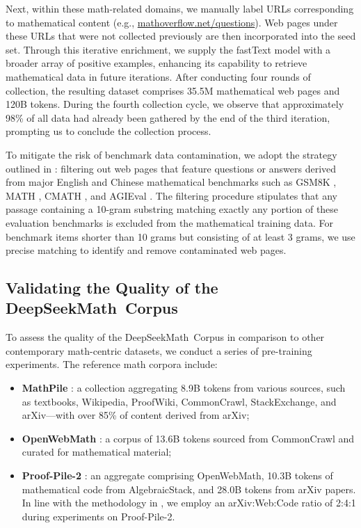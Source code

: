 Next, within these math-related domains, we manually label URLs corresponding to mathematical content (e.g., \url{mathoverflow.net/questions}). Web pages under these URLs that were not collected previously are then incorporated into the seed set. Through this iterative enrichment, we supply the fastText model with a broader array of positive examples, enhancing its capability to retrieve mathematical data in future iterations. After conducting four rounds of collection, the resulting dataset comprises 35.5M mathematical web pages and 120B tokens. During the fourth collection cycle, we observe that approximately 98\% of all data had already been gathered by the end of the third iteration, prompting us to conclude the collection process.

To mitigate the risk of benchmark data contamination, we adopt the strategy outlined in \cite{deepseek-coder}: filtering out web pages that feature questions or answers derived from major English and Chinese mathematical benchmarks such as GSM8K \citep{gsm8k}, MATH \citep{MATH}, CMATH \citep{wei2023cmath}, and AGIEval \citep{agieval}. The filtering procedure stipulates that any passage containing a 10-gram substring matching exactly any portion of these evaluation benchmarks is excluded from the mathematical training data. For benchmark items shorter than 10 grams but consisting of at least 3 grams, we use precise matching to identify and remove contaminated web pages.

\subsection{Validating the Quality of the DeepSeekMath~Corpus}

To assess the quality of the DeepSeekMath~Corpus in comparison to other contemporary math-centric datasets, we conduct a series of pre-training experiments. The reference math corpora include:

\begin{itemize}[topsep=0pt]
    \item \textbf{MathPile} \citep{mathpile}: a collection aggregating 8.9B tokens from various sources, such as textbooks, Wikipedia, ProofWiki, CommonCrawl, StackExchange, and arXiv—with over 85\% of content derived from arXiv;
    \item \textbf{OpenWebMath} \citep{openwebmath}: a corpus of 13.6B tokens sourced from CommonCrawl and curated for mathematical material;
    \item \textbf{Proof-Pile-2} \citep{llemma}: an aggregate comprising OpenWebMath, 10.3B tokens of mathematical code from AlgebraicStack, and 28.0B tokens from arXiv papers. In line with the methodology in \cite{llemma}, we employ an arXiv:Web:Code ratio of 2:4:1 during experiments on Proof-Pile-2.
\end{itemize}

